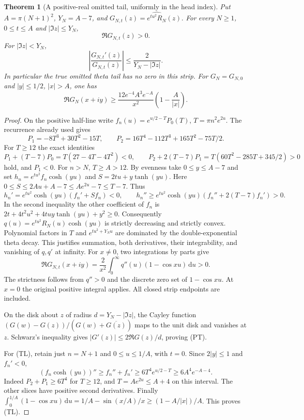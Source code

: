 \documentclass[11pt]{article}
\newtheorem{theorem}{Theorem}
\theoremstyle{remark}\newtheorem{remark}[theorem]{Remark}
\newcommand{\dd}{\,\mathrm d}
\begin{document}
\begin{theorem}[A positive-real omitted tail, uniformly in the head index]
\label{thm:positive-real-tail}
Put $A=\pi(N+1)^2$, $Y_N=A-7$, and
$G_{N,t}(z)=\widehat{e^{tu^2}R_N}(z)$.
For every $N\ge1$, $0\le t\le A$ and $|\Im z|\le Y_N$,
\[
 \Re G_{N,t}(z)>0 .
\]
For $|\Im z|<Y_N$,
\[
 \left|\frac{G_{N,t}'(z)}{G_{N,t}(z)}\right|
                   \le\frac{2}{Y_N-|\Im z|}.            \tag{PT}
\]
In particular the true omitted theta tail has no zero in this strip.
For $G_N=G_{N,0}$ and $|y|\le1/2$, $|x|>A$, one has
\[
 \Re G_N(x+iy)\ge
 \frac{12e^{-4}A^3e^{-A}}{x^2}\left(1-\frac A{|x|}\right). \tag{TL}
\]
\end{theorem}
\begin{proof}
On the positive half-line write
$f_n(u)=e^{u/2-T}P_0(T)$, $T=\pi n^2e^{2u}$.
The recurrence already used gives
\[
 P_1=-8T^3+30T^2-15T,\qquad
 P_2=16T^4-112T^3+165T^2-75T/2.
\]
For $T\ge12$ the exact identities
\[
 P_1+(T-7)P_0=T(27-4T-4T^2)<0,\qquad
 P_2+2(T-7)P_1=T(60T^2-285T+345/2)>0
\]
hold, and $P_1<0$.
For $n>N$, $T\ge A>12$.
By evenness take $0\le y\le A-7$ and set
$h_n=e^{tu^2}f_n\cosh(yu)$ and $S=2tu+y\tanh(yu)$.
Here
$0\le S\le2Au+A-7\le Ae^{2u}-7\le T-7$.
Thus
\[
 h_n'=e^{tu^2}\cosh(yu)(f_n'+Sf_n)<0,\qquad
 h_n''\ge e^{tu^2}\cosh(yu)(f_n''+2(T-7)f_n')>0.
\]
In the second inequality the other coefficient of $f_n$ is
$2t+4t^2u^2+4tuy\tanh(yu)+y^2\ge0$.
Consequently $q(u)=e^{tu^2}R_N(u)\cosh(yu)$ is strictly
decreasing and strictly convex. Polynomial factors in $T$ and
$e^{tu^2+Y_Nu}$ are dominated by the double-exponential theta decay.
This justifies summation, both derivatives, their integrability,
and vanishing of $q,q'$ at infinity.
For $x\ne0$, two integrations by parts give
\[
 \Re G_{N,t}(x+iy)
       =\frac2{x^2}\int_0^\infty q''(u)(1-\cos xu)\dd u>0.
\]
The strictness follows from $q''>0$ and the discrete zero set
of $1-\cos xu$. At $x=0$ the original positive integral applies.
All closed strip endpoints are included.

On the disk about $z$ of radius $d=Y_N-|\Im z|$, the Cayley function
$(G(w)-G(z))/(G(w)+\overline{G(z)})$ maps to the unit disk and vanishes
at $z$. Schwarz's inequality gives
$|G'(z)|\le2\Re G(z)/d$, proving (PT).

For (TL), retain just $n=N+1$ and $0\le u\le1/A$, with $t=0$.
Since $2|y|\le1$ and $f_n'<0$,
\[
 (f_n\cosh(yu))''\ge f_n''+f_n'
       \ge6T^4e^{u/2-T}\ge6A^4e^{-A-4}.
\]
Indeed $P_2+P_1\ge6T^4$ for $T\ge12$, and
$T=Ae^{2u}\le A+4$ on this interval.
The other slices have positive second derivatives.
Finally $\int_0^{1/A}(1-\cos xu)\dd u
=1/A-\sin(x/A)/x\ge(1-A/|x|)/A$.
This proves (TL).
\end{proof}
\end{document}
